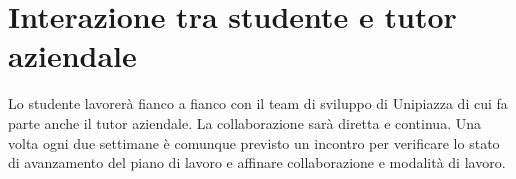 \section*{Interazione tra studente e tutor aziendale}
Lo studente lavorerà fianco a fianco con il team di sviluppo di Unipiazza di cui fa parte anche il tutor aziendale.
La collaborazione sarà diretta e continua. Una volta ogni due settimane è comunque previsto un incontro per verificare lo stato di avanzamento del piano di lavoro e affinare collaborazione e modalità di lavoro.